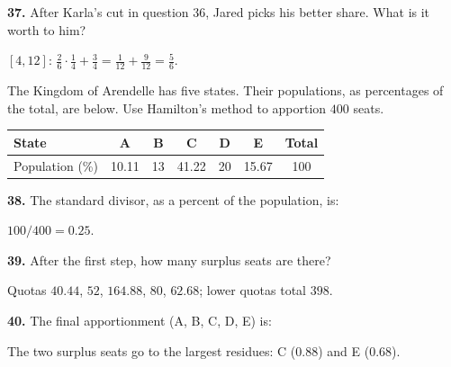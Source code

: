 \documentclass[12pt]{ximera}
\begin{document}
\begin{problem}
\begin{prompt}
\textbf{37.} After Karla's cut in question 36, Jared picks his better share. What is it worth to him?
\begin{multipleChoice}
\end{multipleChoice}
\begin{feedback}
$[4,12]$: $\frac2{6}\cdot\frac14+\frac34=\frac1{12}+\frac9{12}=\frac56$.
\end{feedback}
\end{prompt}
\end{problem}

\begin{problem}
The Kingdom of Arendelle has five states. Their populations, as percentages of the
total, are below. Use Hamilton's method to apportion $400$ seats.
\begin{center}
\begin{tabular}{l|cccccc}
State & A & B & C & D & E & Total\\\hline
Population (\%) & 10.11 & 13 & 41.22 & 20 & 15.67 & 100
\end{tabular}
\end{center}

\begin{prompt}
\textbf{38.} The standard divisor, as a percent of the population, is:
\begin{multipleChoice}
\end{multipleChoice}
\begin{feedback}
$100/400=0.25$.
\end{feedback}
\end{prompt}

\begin{prompt}
\textbf{39.} After the first step, how many surplus seats are there?
\begin{multipleChoice}
\end{multipleChoice}
\begin{feedback}
Quotas $40.44$, $52$, $164.88$, $80$, $62.68$; lower quotas total $398$.
\end{feedback}
\end{prompt}

\begin{prompt}
\textbf{40.} The final apportionment (A, B, C, D, E) is:
\begin{multipleChoice}
\end{multipleChoice}
\begin{feedback}
The two surplus seats go to the largest residues: C ($0.88$) and E ($0.68$).
\end{feedback}
\end{prompt}
\end{problem}
\end{document}
